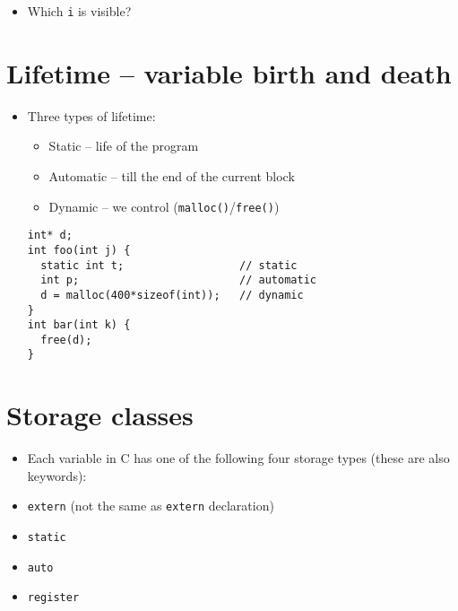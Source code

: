 \documentclass{article}
\begin{document}
\begin{itemize}
\item Which \verb!i! is visible?
\end{itemize}



\section{Lifetime -- variable birth and death}
\begin{itemize}
\item Three types of lifetime:
\begin{itemize}
\item Static -- life of the program
\item Automatic -- till the end of the current block
\item Dynamic -- we control (\verb!malloc()!/\verb!free()!)
\end{itemize}

\begin{verbatim}
int* d;
int foo(int j) {
  static int t;                  // static
  int p;                         // automatic
  d = malloc(400*sizeof(int));   // dynamic
}
int bar(int k) {
  free(d);
}
\end{verbatim}
\end{itemize}



\section{Storage classes}
\begin{itemize}
\item Each variable in C has one of the following four storage types (these are also keywords):

\item \verb!extern! (not the same as \verb!extern! declaration)
\item \verb!static!
\item \verb!auto!
\item \verb!register!
\end{itemize}
\end{document}

